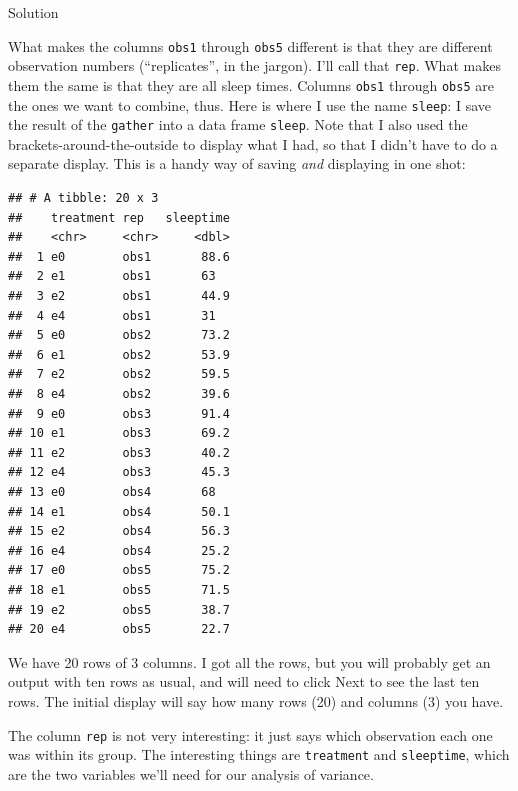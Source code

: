 \documentclass[]{tufte-book}
\newenvironment{Shaded}{}{}
\newcommand{\KeywordTok}[1]{\textcolor[rgb]{0.00,0.44,0.13}{\textbf{#1}}}
\newcommand{\NormalTok}[1]{#1}
\newcommand{\OperatorTok}[1]{\textcolor[rgb]{0.40,0.40,0.40}{#1}}
\newcommand{\StringTok}[1]{\textcolor[rgb]{0.25,0.44,0.63}{#1}}
\theoremstyle{definition}
\theoremstyle{definition}
\theoremstyle{definition}
\theoremstyle{remark}
\begin{document}
Solution

What makes the columns \texttt{obs1} through \texttt{obs5} different is
that they are different observation numbers (``replicates'', in the
jargon). I'll call that \texttt{rep}. What makes them the same is that
they are all sleep times. Columns \texttt{obs1} through \texttt{obs5}
are the ones we want to combine, thus. Here is where I use the name
\texttt{sleep}: I save the result of the \texttt{gather} into a data
frame \texttt{sleep}. Note that I also used the
brackets-around-the-outside to display what I had, so that I didn't have
to do a separate display. This is a handy way of saving \emph{and}
displaying in one shot:

\begin{Shaded}
\end{Shaded}

\begin{verbatim}
## # A tibble: 20 x 3
##    treatment rep   sleeptime
##    <chr>     <chr>     <dbl>
##  1 e0        obs1       88.6
##  2 e1        obs1       63  
##  3 e2        obs1       44.9
##  4 e4        obs1       31  
##  5 e0        obs2       73.2
##  6 e1        obs2       53.9
##  7 e2        obs2       59.5
##  8 e4        obs2       39.6
##  9 e0        obs3       91.4
## 10 e1        obs3       69.2
## 11 e2        obs3       40.2
## 12 e4        obs3       45.3
## 13 e0        obs4       68  
## 14 e1        obs4       50.1
## 15 e2        obs4       56.3
## 16 e4        obs4       25.2
## 17 e0        obs5       75.2
## 18 e1        obs5       71.5
## 19 e2        obs5       38.7
## 20 e4        obs5       22.7
\end{verbatim}

We have 20 rows of 3 columns. I got all the rows, but you will probably
get an output with ten rows as usual, and will need to click Next to see
the last ten rows. The initial display will say how many rows (20) and
columns (3) you have.

The column \texttt{rep} is not very interesting: it just says which
observation each one was within its group.
The interesting things are \texttt{treatment} and \texttt{sleeptime},
which are the two variables we'll need for our analysis of variance.
\end{document}

